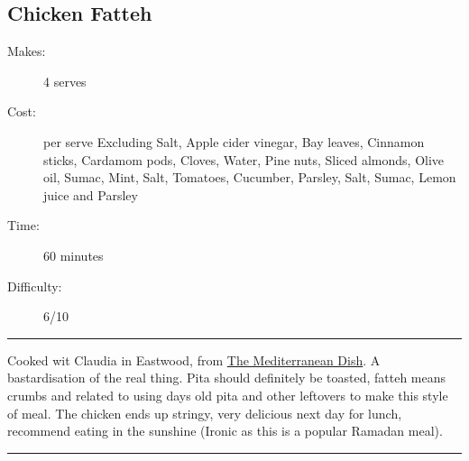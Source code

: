 \documentclass[]{article}
\begin{document}
\subsection*{\center\huge Chicken Fatteh}
\begin{description}
\item[Makes:] 4 serves
\item[Cost:]  per serve Excluding Salt, Apple cider vinegar, Bay leaves, Cinnamon sticks, Cardamom pods, Cloves, Water, Pine nuts, Sliced almonds, Olive oil, Sumac, Mint, Salt, Tomatoes, Cucumber, Parsley, Salt, Sumac, Lemon juice and Parsley
\item[Time:] 60 minutes
\item[Difficulty:] 6/10
\end{description}
\vspace{0.2cm}\hrule\vspace{0.5cm}
\begin{adjustwidth}{0.5 cm}{0.5 cm}

Cooked wit Claudia in Eastwood, from \href{https://www.themediterraneandish.com/lebanese-chicken-fatteh-dinner-bowls/}{The Mediterranean Dish}. A bastardisation of the real thing. Pita should definitely be toasted, fatteh means crumbs and related to using days old pita and other leftovers to make this style of meal. The chicken ends up stringy, very delicious next day for lunch, recommend eating in the sunshine (Ironic as this is a popular Ramadan meal). \hfill{}\color{black}

\end{adjustwidth}
\vspace{0.5cm}\hrule
\end{document}
